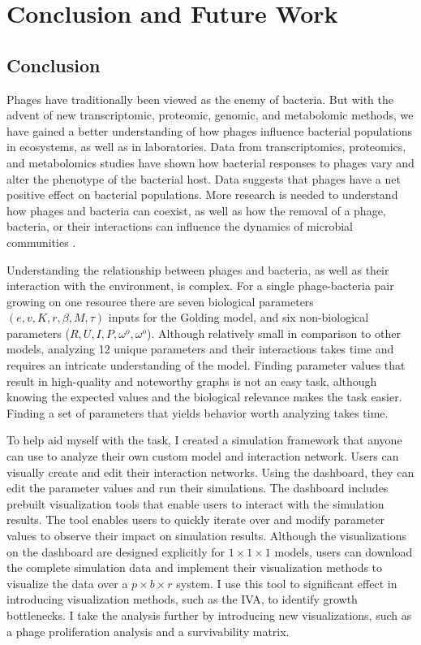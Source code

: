 \chapter{Conclusion and Future Work}
\label{CAFW}

\section{Conclusion}
\label{Conclusion}
Phages have traditionally been viewed as the enemy of bacteria. 
But with the advent of new transcriptomic, proteomic, genomic, and metabolomic methods, we have gained a better understanding of how phages influence bacterial populations in ecosystems, as well as in laboratories. 
Data from transcriptomics, proteomics, and metabolomics studies have shown how bacterial responses to phages vary and alter the phenotype of the bacterial host. 
Data suggests that phages have a net positive effect on bacterial populations. 
More research is needed to understand how phages and bacteria can coexist, as well as how the removal of a phage, bacteria, or their interactions can influence the dynamics of microbial communities \cite{fernandezPhageFoeInsight2018}. 

Understanding the relationship between phages and bacteria, as well as their interaction with the environment, is complex. 
For a single phage-bacteria pair growing on one resource there are seven biological parameters $(e, v, K, r, \beta, M, \tau)$ inputs for the Golding model, and six non-biological parameters ($R, U, I, P, \omega^o, \omega^o$). 
Although relatively small in comparison to other models, analyzing 12 unique parameters and their interactions takes time and requires an intricate understanding of the model. 
Finding parameter values that result in high-quality and noteworthy graphs is not an easy task, although knowing the expected values and the biological relevance makes the task easier. 
Finding a set of parameters that yields behavior worth analyzing takes time. 


To help aid myself with the task, I created a simulation framework that anyone can use to analyze their own custom model and interaction network. 
Users can visually create and edit their interaction networks. 
Using the dashboard, they can edit the parameter values and run their simulations. 
The dashboard includes prebuilt visualization tools that enable users to interact with the simulation results. 
The tool enables users to quickly iterate over and modify parameter values to observe their impact on simulation results. 
Although the visualizations on the dashboard are designed explicitly for $1\times 1\times 1$ models, users can download the complete simulation data and implement their visualization methods to visualize the data over a $p\times b\times r$ system. 
I use this tool to significant effect in introducing visualization methods, such as the IVA, to identify growth bottlenecks. 
I take the analysis further by introducing new visualizations, such as a phage proliferation analysis and a survivability matrix. 

